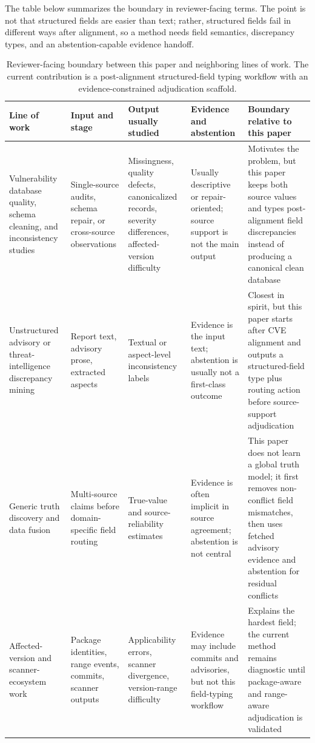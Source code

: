 The table below summarizes the boundary in reviewer-facing terms. The point is not that structured fields are easier than text; rather, structured fields fail in different ways after alignment, so a method needs field semantics, discrepancy types, and an abstention-capable evidence handoff.

\begin{table}[!htbp]
\centering
\setlength{\tabcolsep}{3pt}
\scriptsize
\caption{Reviewer-facing boundary between this paper and neighboring lines of work. The current contribution is a post-alignment structured-field typing workflow with an evidence-constrained adjudication scaffold.}
\label{tab:08-related-table-1}
\begin{tabularx}{\textwidth}{>{\raggedright\arraybackslash}p{}>{\raggedright\arraybackslash}X>{\raggedright\arraybackslash}X>{\raggedright\arraybackslash}X>{\raggedright\arraybackslash}X}
\toprule
Line of work & Input and stage & Output usually studied & Evidence and abstention & Boundary relative to this paper \\
\midrule
Vulnerability database quality, schema cleaning, and inconsistency studies & Single-source audits, schema repair, or cross-source observations & Missingness, quality defects, canonicalized records, severity differences, affected-version difficulty & Usually descriptive or repair-oriented; source support is not the main output & Motivates the problem, but this paper keeps both source values and types post-alignment field discrepancies instead of producing a canonical clean database \\
Unstructured advisory or threat-intelligence discrepancy mining & Report text, advisory prose, extracted aspects & Textual or aspect-level inconsistency labels & Evidence is the input text; abstention is usually not a first-class outcome & Closest in spirit, but this paper starts after CVE alignment and outputs a structured-field type plus routing action before source-support adjudication \\
Generic truth discovery and data fusion & Multi-source claims before domain-specific field routing & True-value and source-reliability estimates & Evidence is often implicit in source agreement; abstention is not central & This paper does not learn a global truth model; it first removes non-conflict field mismatches, then uses fetched advisory evidence and abstention for residual conflicts \\
Affected-version and scanner-ecosystem work & Package identities, range events, commits, scanner outputs & Applicability errors, scanner divergence, version-range difficulty & Evidence may include commits and advisories, but not this field-typing workflow & Explains the hardest field; the current method remains diagnostic until package-aware and range-aware adjudication is validated \\
\bottomrule
\end{tabularx}
\end{table}

